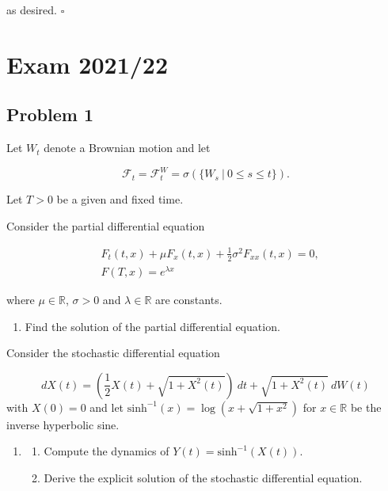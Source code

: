 \documentclass[
]{book}
\providecommand{\tightlist}{%
  \setlength{\itemsep}{0pt}\setlength{\parskip}{0pt}}
\begin{document}
as desired. \(\square\)

\noindent\makebox[\linewidth]{\rule{\textwidth}{0.4pt}}
\pagebreak

\hypertarget{exam-202122}{%
\section{Exam 2021/22}\label{exam-202122}}

\hypertarget{problem-1-4}{%
\subsection{Problem 1}\label{problem-1-4}}

Let \(W_t\) denote a Brownian motion and let

\[
\mathcal{F}_t=\mathcal{F}_t^W=\sigma(\{W_s\ \vert\ 0\le s\le t\}).
\]

Let \(T>0\) be a given and fixed time.

Consider the partial differential equation

\begin{align*}
&F_t(t,x)+\mu F_x(t,x)+\frac{1}{2}\sigma^2 F_{xx}(t,x)=0,\\
&F(T,x)=e^{\lambda x}
\end{align*}

where \(\mu\in\mathbb{R}\), \(\sigma>0\) and \(\lambda \in \mathbb{R}\) are constants.

\begin{enumerate}
\def\labelenumi{\alph{enumi}.}
\tightlist
\item
  Find the solution of the partial differential equation.
\end{enumerate}

Consider the stochastic differential equation

\[
dX(t)=\left(\frac{1}{2}X(t)+\sqrt{1+X^2(t)}\right)\ dt+\sqrt{1+X^2(t)}\ dW(t)
\]
with \(X(0)=0\) and let \(\text{sinh}^{-1}(x)=\log\left(x+\sqrt{1+x^2}\right)\) for \(x\in\mathbb{R}\) be the inverse hyperbolic sine.

\begin{enumerate}
\def\labelenumi{\alph{enumi}.}
\setcounter{enumi}{1}
\item
  \begin{enumerate}
  \def\labelenumii{\roman{enumii}.}
  \tightlist
  \item
    Compute the dynamics of \(Y(t)=\text{sinh}^{-1}(X(t))\).
  \item
    Derive the explicit solution of the stochastic differential equation.
  \end{enumerate}
\end{enumerate}
\end{document}
